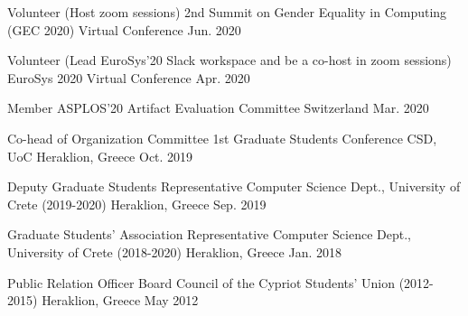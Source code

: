 \begin{cvhonors}
  \cvhonor
    {Volunteer (Host zoom sessions)} %
    {2nd Summit on Gender Equality in Computing (GEC 2020)} %
    {Virtual Conference} %
    {Jun. 2020} %


  \cvhonor
    {Volunteer (Lead EuroSys'20 Slack workspace and be a co-host in
    zoom sessions)} %
    {EuroSys 2020} %
    {Virtual Conference} %
    {Apr. 2020} %


  \cvhonor
    {Member} %
    {ASPLOS'20 Artifact Evaluation Committee} %
    {Switzerland} %
    {Mar. 2020} %

  \cvhonor
    {Co-head of Organization Committee} %
    {1st Graduate Students Conference CSD, UoC} %
    {Heraklion, Greece} %
    {Oct. 2019} %

  \cvhonor
    {Deputy Graduate Students Representative} %
    {Computer Science Dept., University of Crete (2019-2020)} %
    {Heraklion, Greece} %
    {Sep. 2019} %

  \cvhonor
    {Graduate Students' Association Representative} %
    {Computer Science Dept., University of Crete (2018-2020)} %
    {Heraklion, Greece} %
    {Jan. 2018} %

  \cvhonor
    {Public Relation Officer} %
    {Board Council of the Cypriot Students' Union (2012-2015)} %
    {Heraklion, Greece} %
    {May 2012} %

\end{cvhonors}
